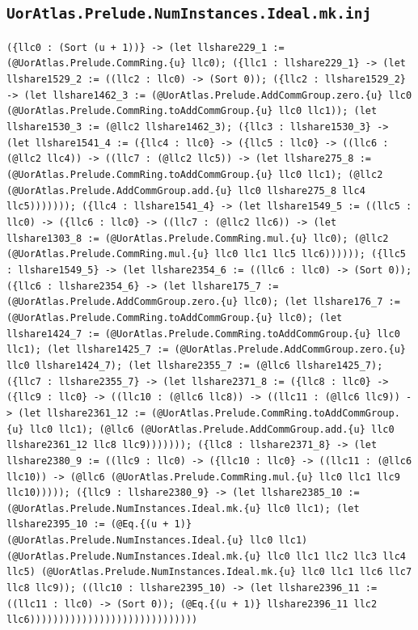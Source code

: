 \documentclass[11pt]{article}
\begin{document}
\subsection*{\texttt{UorAtlas.Prelude.NumInstances.Ideal.mk.inj}}
\noindent\texttt{(\{llc0 : (Sort (u + 1))\} -> (let llshare229\_1 := (@UorAtlas.Prelude.CommRing.\{u\} llc0); (\{llc1 : llshare229\_1\} -> (let llshare1529\_2 := ((llc2 : llc0) -> (Sort 0)); (\{llc2 : llshare1529\_2\} -> (let llshare1462\_3 := (@UorAtlas.Prelude.AddCommGroup.zero.\{u\} llc0 (@UorAtlas.Prelude.CommRing.toAddCommGroup.\{u\} llc0 llc1)); (let llshare1530\_3 := (@llc2 llshare1462\_3); (\{llc3 : llshare1530\_3\} -> (let llshare1541\_4 := (\{llc4 : llc0\} -> (\{llc5 : llc0\} -> ((llc6 : (@llc2 llc4)) -> ((llc7 : (@llc2 llc5)) -> (let llshare275\_8 := (@UorAtlas.Prelude.CommRing.toAddCommGroup.\{u\} llc0 llc1); (@llc2 (@UorAtlas.Prelude.AddCommGroup.add.\{u\} llc0 llshare275\_8 llc4 llc5))))))); (\{llc4 : llshare1541\_4\} -> (let llshare1549\_5 := ((llc5 : llc0) -> (\{llc6 : llc0\} -> ((llc7 : (@llc2 llc6)) -> (let llshare1303\_8 := (@UorAtlas.Prelude.CommRing.mul.\{u\} llc0); (@llc2 (@UorAtlas.Prelude.CommRing.mul.\{u\} llc0 llc1 llc5 llc6)))))); (\{llc5 : llshare1549\_5\} -> (let llshare2354\_6 := ((llc6 : llc0) -> (Sort 0)); (\{llc6 : llshare2354\_6\} -> (let llshare175\_7 := (@UorAtlas.Prelude.AddCommGroup.zero.\{u\} llc0); (let llshare176\_7 := (@UorAtlas.Prelude.CommRing.toAddCommGroup.\{u\} llc0); (let llshare1424\_7 := (@UorAtlas.Prelude.CommRing.toAddCommGroup.\{u\} llc0 llc1); (let llshare1425\_7 := (@UorAtlas.Prelude.AddCommGroup.zero.\{u\} llc0 llshare1424\_7); (let llshare2355\_7 := (@llc6 llshare1425\_7); (\{llc7 : llshare2355\_7\} -> (let llshare2371\_8 := (\{llc8 : llc0\} -> (\{llc9 : llc0\} -> ((llc10 : (@llc6 llc8)) -> ((llc11 : (@llc6 llc9)) -> (let llshare2361\_12 := (@UorAtlas.Prelude.CommRing.toAddCommGroup.\{u\} llc0 llc1); (@llc6 (@UorAtlas.Prelude.AddCommGroup.add.\{u\} llc0 llshare2361\_12 llc8 llc9))))))); (\{llc8 : llshare2371\_8\} -> (let llshare2380\_9 := ((llc9 : llc0) -> (\{llc10 : llc0\} -> ((llc11 : (@llc6 llc10)) -> (@llc6 (@UorAtlas.Prelude.CommRing.mul.\{u\} llc0 llc1 llc9 llc10))))); (\{llc9 : llshare2380\_9\} -> (let llshare2385\_10 := (@UorAtlas.Prelude.NumInstances.Ideal.mk.\{u\} llc0 llc1); (let llshare2395\_10 := (@Eq.\{(u + 1)\} (@UorAtlas.Prelude.NumInstances.Ideal.\{u\} llc0 llc1) (@UorAtlas.Prelude.NumInstances.Ideal.mk.\{u\} llc0 llc1 llc2 llc3 llc4 llc5) (@UorAtlas.Prelude.NumInstances.Ideal.mk.\{u\} llc0 llc1 llc6 llc7 llc8 llc9)); ((llc10 : llshare2395\_10) -> (let llshare2396\_11 := ((llc11 : llc0) -> (Sort 0)); (@Eq.\{(u + 1)\} llshare2396\_11 llc2 llc6)))))))))))))))))))))))))))))}\par
\end{document}
